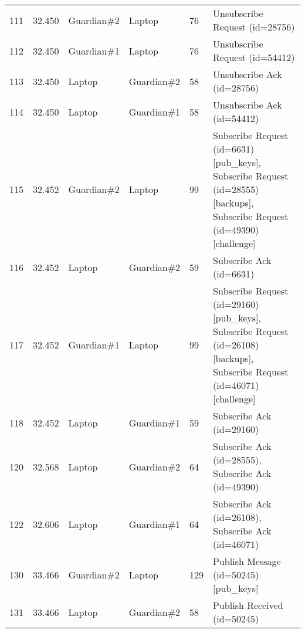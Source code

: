 \begin{table}[]
\begin{tabular}{llllll}
111 & 32.450 & Guardian\#2 & Laptop      & 76     & Unsubscribe Request (id=28756)                                                                                                         \\
112 & 32.450 & Guardian\#1 & Laptop      & 76     & Unsubscribe Request (id=54412)                                                                                                         \\
113 & 32.450 & Laptop      & Guardian\#2 & 58     & Unsubscribe Ack (id=28756)                                                                                                             \\
114 & 32.450 & Laptop      & Guardian\#1 & 58     & Unsubscribe Ack (id=54412)                                                                                                             \\
115 & 32.452 & Guardian\#2 & Laptop      & 99     & Subscribe Request (id=6631) {[}pub\_keys{]}, Subscribe Request (id=28555) {[}backups{]}, Subscribe Request (id=49390) {[}challenge{]}  \\
116 & 32.452 & Laptop      & Guardian\#2 & 59     & Subscribe Ack (id=6631)                                                                                                                \\
117 & 32.452 & Guardian\#1 & Laptop      & 99     & Subscribe Request (id=29160) {[}pub\_keys{]}, Subscribe Request (id=26108) {[}backups{]}, Subscribe Request (id=46071) {[}challenge{]} \\
118 & 32.452 & Laptop      & Guardian\#1 & 59     & Subscribe Ack (id=29160)                                                                                                               \\
120 & 32.568 & Laptop      & Guardian\#2 & 64     & Subscribe Ack (id=28555), Subscribe Ack (id=49390)                                                                                     \\
122 & 32.606 & Laptop      & Guardian\#1 & 64     & Subscribe Ack (id=26108), Subscribe Ack (id=46071)                                                                                     \\
130 & 33.466 & Guardian\#2 & Laptop      & 129    & Publish Message (id=50245) {[}pub\_keys{]}                                                                                             \\
131 & 33.466 & Laptop      & Guardian\#2 & 58     & Publish Received (id=50245)                                                                                                            \\

\end{tabular}
\end{table}
